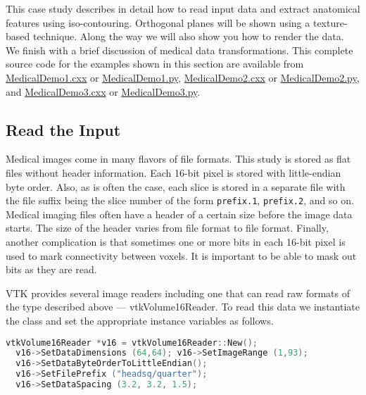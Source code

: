 This case study describes in detail how to read input data and extract anatomical features using iso-contouring. Orthogonal planes will be shown using a texture-based technique. Along the way we will also show you how to render the data. We finish with a brief discussion of medical data transformations. This complete source code for the examples shown in this section are available from 
\href{https://lorensen.github.io/VTKExamples/site/Cxx/Medical/MedicalDemo1/}{MedicalDemo1.cxx} or \href{https://lorensen.github.io/VTKExamples/site/Python/Medical/MedicalDemo1/}{MedicalDemo1.py}, 
\href{https://lorensen.github.io/VTKExamples/site/Cxx/Medical/MedicalDemo2/}{MedicalDemo2.cxx} or \href{https://lorensen.github.io/VTKExamples/site/Python/Medical/MedicalDemo2/}{MedicalDemo2.py}, and
\href{https://lorensen.github.io/VTKExamples/site/Cxx/Medical/MedicalDemo3/}{MedicalDemo3.cxx} or \href{https://lorensen.github.io/VTKExamples/site/Python/Medical/MedicalDemo3/}{MedicalDemo3.py}.

\subsection{Read the Input}

Medical images come in many flavors of file formats. This study is stored as flat files without header information. Each 16-bit pixel is stored with little-endian byte order. Also, as is often the case, each slice is stored in a separate file with the file suffix being the slice number of the form \texttt{prefix.1}, \texttt{prefix.2}, and so on. Medical imaging files often have a header of a certain size before the image data starts. The size of the header varies from file format to file format. Finally, another complication is that sometimes one or more bits in each 16-bit pixel is used to mark connectivity between voxels. It is important to be able to mask out bits as they are read.

VTK provides several image readers including one that can read raw formats of the type described above --- vtkVolume16Reader. To read this data we instantiate the class and set the appropriate instance variables as follows.

\begin{lstlisting}[language=C++, caption={Reading raw formatted files.}]
vtkVolume16Reader *v16 = vtkVolume16Reader::New();
  v16->SetDataDimensions (64,64); v16->SetImageRange (1,93);
  v16->SetDataByteOrderToLittleEndian();
  v16->SetFilePrefix ("headsq/quarter");
  v16->SetDataSpacing (3.2, 3.2, 1.5);
\end{lstlisting}

